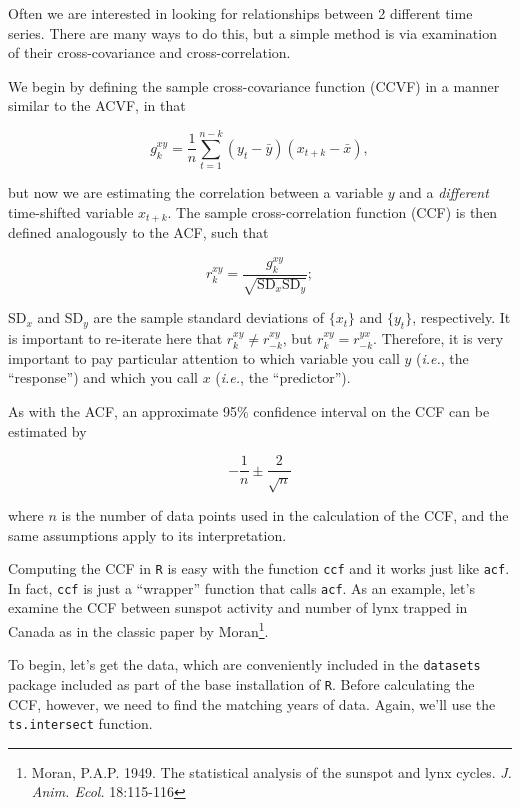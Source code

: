 Often we are interested in looking for relationships between 2 different time series.  There are many ways to do this, but a simple method is via examination of their cross-covariance and cross-correlation.

We begin by defining the sample cross-covariance function (CCVF) in a manner similar to the ACVF, in that

\begin{equation}\label{eqn:CCVF}
g_k^{xy} = \frac{1}{n}\sum_{t=1}^{n-k} \left(y_t-\bar{y}\right) \left(x_{t+k}-\bar{x}\right),
\end{equation}

\noindent but now we are estimating the correlation between a variable $y$ and a \emph{different} time-shifted variable $x_{t+k}$.  The sample cross-correlation function (CCF) is then defined analogously to the ACF, such that

\begin{equation}\label{eqn:CCF}
r_k^{xy} = \frac{g_k^{xy}}{\sqrt{\text{SD}_x\text{SD}_y}};
\end{equation}

\noindent SD$_x$ and SD$_y$ are the sample standard deviations of $\{x_t\}$ and $\{y_t\}$, respectively. It is important to re-iterate here that $r_k^{xy} \neq r_{-k}^{xy}$, but $r_k^{xy} = r_{-k}^{yx}$.  Therefore, it is very important to pay particular attention to which variable you call $y$ (\emph{i.e.}, the ``response'') and which you call $x$ (\emph{i.e.}, the ``predictor'').

As with the ACF, an approximate 95\% confidence interval on the CCF can be estimated by

\begin{equation}\label{eqn:CCF95CI}
-\frac{1}{n} \pm \frac{2}{\sqrt{n}}
\end{equation}

\noindent where $n$ is the number of data points used in the calculation of the CCF, and the same assumptions apply to its interpretation.

Computing the CCF in \texttt{R} is easy with the function \texttt{ccf} and it works just like \texttt{acf}.  In fact, \texttt{ccf} is just a ``wrapper'' function that calls \texttt{acf}.  As an example, let's examine the CCF between sunspot activity and number of lynx trapped in Canada as in the classic paper by Moran\footnote{Moran, P.A.P. 1949. The statistical analysis of the sunspot and lynx cycles. \emph{J. Anim. Ecol.} 18:115-116}.

To begin, let's get the data, which are conveniently included in the \texttt{datasets} package included as part of the base installation of \texttt{R}.  Before calculating the CCF, however, we need to find the matching years of data.  Again, we'll use the \texttt{ts.intersect} function.

